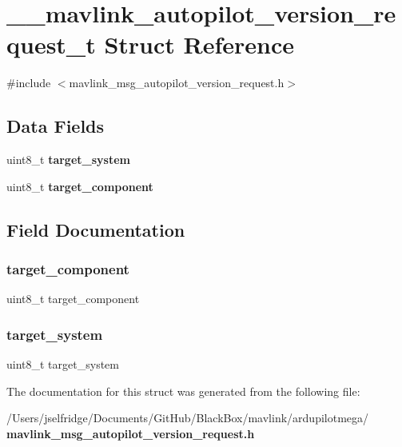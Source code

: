 \section{\+\_\+\+\_\+mavlink\+\_\+autopilot\+\_\+version\+\_\+request\+\_\+t Struct Reference}
\label{struct____mavlink__autopilot__version__request__t}


{\ttfamily \#include $<$mavlink\+\_\+msg\+\_\+autopilot\+\_\+version\+\_\+request.\+h$>$}

\subsection*{Data Fields}
\begin{DoxyCompactItemize}
\item 
uint8\+\_\+t \textbf{ target\+\_\+system}
\item 
uint8\+\_\+t \textbf{ target\+\_\+component}
\end{DoxyCompactItemize}


\subsection{Field Documentation}
\mbox{\label{struct____mavlink__autopilot__version__request__t_a1763123cfc5fa7f9c51ec44947d5790f}} 
\subsubsection{target\+\_\+component}
{\footnotesize\ttfamily uint8\+\_\+t target\+\_\+component}

\mbox{\label{struct____mavlink__autopilot__version__request__t_ac9afff43526a157e4c4e45607c1418b8}} 
\subsubsection{target\+\_\+system}
{\footnotesize\ttfamily uint8\+\_\+t target\+\_\+system}



The documentation for this struct was generated from the following file\+:\begin{DoxyCompactItemize}
\item 
/\+Users/jselfridge/\+Documents/\+Git\+Hub/\+Black\+Box/mavlink/ardupilotmega/\textbf{ mavlink\+\_\+msg\+\_\+autopilot\+\_\+version\+\_\+request.\+h}\end{DoxyCompactItemize}
